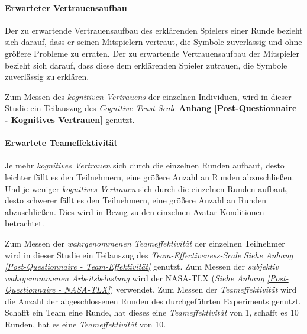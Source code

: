 \documentclass[a4paper,11pt]{article}%
\renewcommand{\\}{\vspace*{0.5\baselineskip} \newline}
\begin{document}
{\paragraph{Erwarteter Vertrauensaufbau}
Der zu erwartende Vertrauensaufbau des erklärenden Spielers einer Runde bezieht sich darauf, dass er seinen Mitspielern vertraut, die Symbole zuverlässig und ohne größere Probleme zu erraten. Der zu erwartende Vertrauensaufbau der Mitspieler bezieht sich darauf, dass diese dem erklärenden Spieler zutrauen, die Symbole zuverlässig zu erklären.

Zum Messen des \textit{kognitiven Vertrauens} der einzelnen Individuen, wird in dieser Studie ein Teilauszug des \textit{Cognitive-Trust-Scale} \citep[S. 37]{mcallister1995affect} \textbf{Anhang \ref{Post-Questionnaire - Kognitives Vertrauen}} genutzt.

\paragraph{Erwartete Teameffektivität}
Je mehr \textit{kognitives Vertrauen} sich durch die einzelnen Runden aufbaut, desto leichter fällt es den Teilnehmern, eine größere Anzahl an Runden abzuschließen. Und je weniger \textit{kognitives Vertrauen} sich durch die einzelnen Runden aufbaut, desto schwerer fällt es den Teilnehmern, eine größere Anzahl an Runden abzuschließen. Dies wird in Bezug zu den einzelnen Avatar-Konditionen betrachtet.

Zum Messen der \textit{wahrgenommenen Teameffektivität} der einzelnen Teilnehmer wird in dieser Studie ein Teilauszug des \textit{Team-Effectiveness-Scale} \textit{Siehe Anhang \ref{Post-Questionnaire - Team-Effektivität}} \citep[S. 469]{gibson2003team} genutzt.  Zum Messen der \textit{subjektiv wahrgenommenen Arbeitsbelastung} wird der NASA-TLX (\textit{Siehe Anhang \ref{Post-Questionnaire - NASA-TLX}}) \citep{NASATLX} verwendet.
Zum Messen der \textit{Teameffektivität} wird die Anzahl der abgeschlossenen Runden des durchgeführten Experiments genutzt. Schafft ein Team eine Runde, hat dieses eine \textit{Teameffektivität} von 1, schafft es 10 Runden, hat es eine \textit{Teameffektivität} von 10.

\newpage
}
\end{document}
